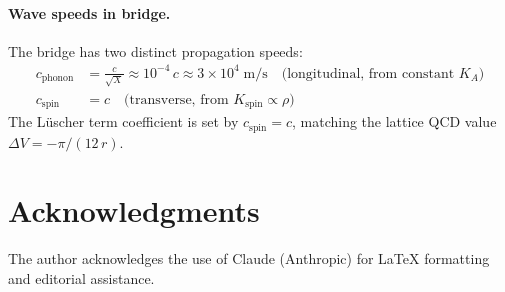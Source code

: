 ﻿\documentclass[12pt,letterpaper]{article}
\newcommand{\Ka}{K_{\!A}}
\begin{document}
\paragraph{Wave speeds in bridge.}
The bridge has two distinct propagation speeds:
%
\begin{align}
  c_{\mathrm{phonon}} &= \frac{c}{\sqrt{X}}
    \approx 10^{-4}\,c
    \approx 3 \times 10^4\;\mathrm{m/s}
    \quad\text{(longitudinal, from constant $\Ka$)}
    \label{eq:sum-bridge-cphonon} \\
  c_{\mathrm{spin}} &= c
    \quad\text{(transverse, from $K_{\mathrm{spin}} \propto \rho$)}
    \label{eq:sum-bridge-cspin}
\end{align}
%
The L\"uscher term coefficient is set by $c_{\mathrm{spin}} = c$,
matching the lattice QCD value $\Delta V = -\pi/(12\,r)$.



\section*{Acknowledgments}

The author acknowledges the use of Claude (Anthropic) for \LaTeX{} formatting
and editorial assistance.

\bigskip


\end{document}
